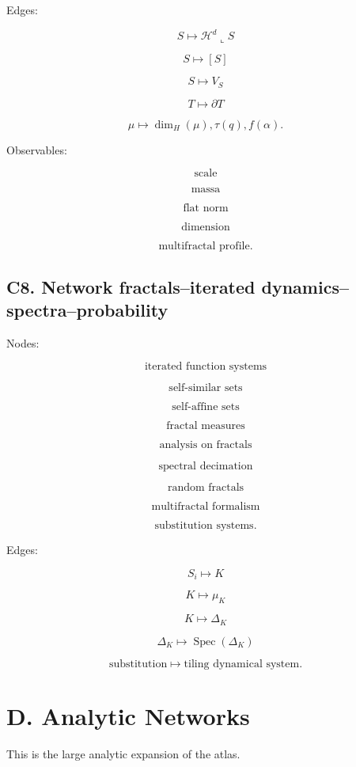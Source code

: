 \documentclass[11pt]{article}
\begin{document}
Edges:

\[
S\mapsto \mathcal H^d\llcorner S
\]

\[
S\mapsto [S]
\]

\[
S\mapsto V_S
\]

\[
T\mapsto \partial T
\]

\[
\mu\mapsto \dim_H(\mu),\tau(q),f(\alpha).
\]

Observables:

\[
\text{scale}
\]

\[
\text{massa}
\]

\[
\text{flat norm}
\]

\[
\text{dimension}
\]

\[
\text{multifractal profile}.
\]



\subsection{C8. Network fractals--iterated dynamics--spectra--probability}

Nodes:

\[
\text{iterated function systems}
\]

\[
\text{self-similar sets}
\]

\[
\text{self-affine sets}
\]

\[
\text{fractal measures}
\]

\[
\text{analysis on fractals}
\]

\[
\text{spectral decimation}
\]

\[
\text{random fractals}
\]

\[
\text{multifractal formalism}
\]

\[
\text{substitution systems}.
\]

Edges:

\[
{S_i}\mapsto K
\]

\[
K\mapsto \mu_K
\]

\[
K\mapsto \Delta_K
\]

\[
\Delta_K\mapsto \operatorname{Spec}(\Delta_K)
\]

\[
\text{substitution}\mapsto \text{tiling dynamical system}.
\]



\section{D. Analytic Networks}

This is the large analytic expansion of the atlas.
\end{document}
